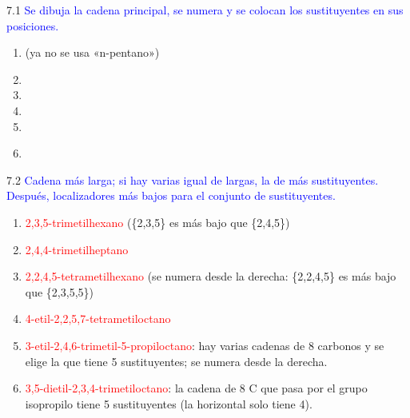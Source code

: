 \begin{Solution}{7.1}
        \textcolor{blue}{Se dibuja la cadena principal, se numera y se colocan los sustituyentes en sus posiciones.}
        \begin{enumerate}[label=\alph*)]
            \item {} \quad (ya no se usa «n-pentano»)
            \item {}
            \item {}
            \item {}
            \item {}
            \item {}\\
        \end{enumerate}
    
\end{Solution}
\begin{Solution}{7.2}
        \textcolor{blue}{Cadena más larga; si hay varias igual de largas, la de más sustituyentes. Después, localizadores más bajos para el conjunto de sustituyentes.}
        \begin{enumerate}[label=\alph*)]
            \item \textcolor{red}{2,3,5-trimetilhexano} (\{2,3,5\} es más bajo que \{2,4,5\})
            \item \textcolor{red}{2,4,4-trimetilheptano}
            \item \textcolor{red}{2,2,4,5-tetrametilhexano} (se numera desde la derecha: \{2,2,4,5\} es más bajo que \{2,3,5,5\})
            \item \textcolor{red}{4-etil-2,2,5,7-tetrametiloctano}
            \item \textcolor{red}{3-etil-2,4,6-trimetil-5-propiloctano}: hay varias cadenas de 8 carbonos y se elige la que tiene 5 sustituyentes; se numera desde la derecha.
            \item \textcolor{red}{3,5-dietil-2,3,4-trimetiloctano}: la cadena de 8 C que pasa por el grupo isopropilo tiene 5 sustituyentes (la horizontal solo tiene 4).
        \end{enumerate}
    
\end{Solution}
